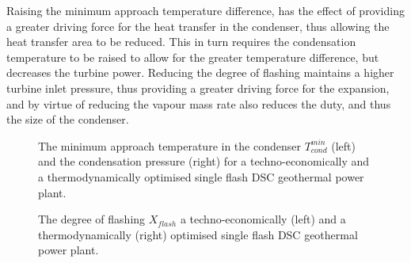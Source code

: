     Raising the minimum approach temperature difference, has the effect of providing a greater driving force for the heat transfer in the condenser, thus allowing the heat transfer area to be reduced. This in turn requires the condensation temperature to be raised to allow for the greater temperature difference, but decreases the turbine power. Reducing the degree of flashing maintains a higher turbine inlet pressure, thus providing a greater driving force for the expansion, and by virtue of reducing the vapour mass rate also reduces the duty, and thus the size of the condenser. 

    \begin{figure}[H]
        \centering
        \resizebox{\linewidth}{!}{}
        \caption[The minimum approach temperature in the condenser and condensation pressure for a techno-economically and a thermodynamically optimised single flash \ac{DSC} geothermal power plant.]{The minimum approach temperature in the condenser \(T_{cond}^{min}\) (left) and the condensation pressure (right) for a techno-economically and a thermodynamically optimised single flash \ac{DSC} geothermal power plant.}
        \label{fig:prosim_purewater_DSC_techno_opt_DTpinch_Pmin}
    \end{figure}
    

    
    \begin{figure}[H]
        \centering
        \resizebox{\linewidth}{!}{}
        \caption{The degree of flashing \(X_{flash}\) a techno-economically (left) and a thermodynamically (right) optimised single flash \ac{DSC} geothermal power plant.}
        \label{fig:prosim_purewater_DSC_techno_opt_Xflash}
    \end{figure}

